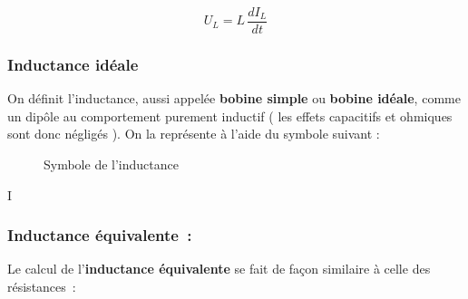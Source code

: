\begin{equation}
	U_L = L \, \dfrac{dI_L}{dt}
\end{equation}

\subsubsection{Inductance idéale }
On définit l'inductance, aussi appelée \textbf{bobine simple} ou \textbf{bobine idéale}, comme un dipôle au comportement purement inductif ( les effets capacitifs et ohmiques sont donc négligés ). On la représente à l’aide du symbole suivant :

\begin{figure}[!h]
\centering

	\caption{Symbole de l'inductance}
\end{figure}

I\subsubsection{Inductance équivalente~: }

Le calcul de l'\textbf{inductance équivalente} se fait de façon similaire à celle des résistances~:\\ 

